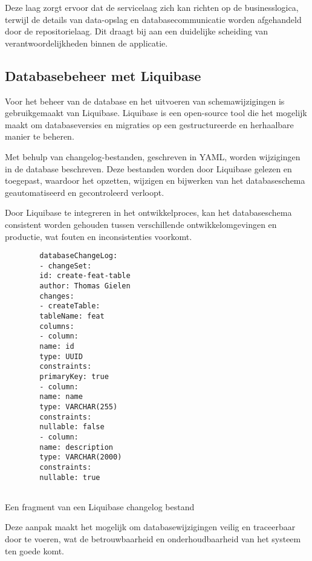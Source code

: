Deze laag zorgt ervoor dat de servicelaag zich kan richten op de businesslogica, terwijl de details van data-opslag en databasecommunicatie worden afgehandeld door de repositorielaag. Dit draagt bij aan een duidelijke scheiding van verantwoordelijkheden binnen de applicatie.

\subsection{Databasebeheer met Liquibase}

Voor het beheer van de database en het uitvoeren van schemawijzigingen is gebruikgemaakt van Liquibase. Liquibase is een open-source tool die het mogelijk maakt om databaseversies en migraties op een gestructureerde en herhaalbare manier te beheren.

Met behulp van changelog-bestanden, geschreven in YAML, worden wijzigingen in de database beschreven. Deze bestanden worden door Liquibase gelezen en toegepast, waardoor het opzetten, wijzigen en bijwerken van het databaseschema geautomatiseerd en gecontroleerd verloopt.

Door Liquibase te integreren in het ontwikkelproces, kan het databaseschema consistent worden gehouden tussen verschillende ontwikkelomgevingen en productie, wat fouten en inconsistenties voorkomt.

\begin{listing}
    \begin{verbatim}
        databaseChangeLog:
        - changeSet:
        id: create-feat-table
        author: Thomas Gielen
        changes:
        - createTable:
        tableName: feat
        columns:
        - column:
        name: id
        type: UUID
        constraints:
        primaryKey: true
        - column:
        name: name
        type: VARCHAR(255)
        constraints:
        nullable: false
        - column:
        name: description
        type: VARCHAR(2000)
        constraints:
        nullable: true
        
    \end{verbatim}
    \caption[LiquibaseExample]{Een fragment van een Liquibase changelog bestand}
\end{listing}

Deze aanpak maakt het mogelijk om databasewijzigingen veilig en traceerbaar door te voeren, wat de betrouwbaarheid en onderhoudbaarheid van het systeem ten goede komt.




